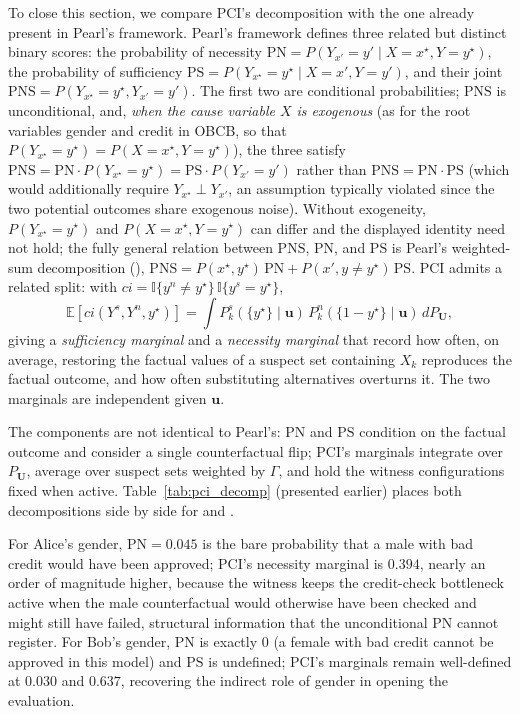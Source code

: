 To close this section, we compare PCI's decomposition with the one already
present in Pearl's framework. Pearl's framework defines three related but distinct
binary scores: the probability of necessity
$\mathrm{PN} = P(Y_{x'} = y' \mid X = x^\star, Y = y^\star)$, the probability of sufficiency
$\mathrm{PS} = P(Y_{x^\star} = y^\star \mid X = x', Y = y')$, and their joint
$\mathrm{PNS} = P(Y_{x^\star} = y^\star, Y_{x'} = y')$. The first two are conditional
probabilities; $\mathrm{PNS}$ is unconditional, and, \emph{when the cause variable
$X$ is exogenous} (as for the root variables gender and credit in OBCB, so that
$P(Y_{x^\star}=y^\star)=P(X=x^\star,Y=y^\star)$), the three satisfy
$\mathrm{PNS} = \mathrm{PN}\cdot P(Y_{x^\star}=y^\star) = \mathrm{PS}\cdot P(Y_{x'}=y')$ rather
than $\mathrm{PNS} = \mathrm{PN}\cdot\mathrm{PS}$ (which would additionally require
$Y_{x^\star}\perp Y_{x'}$, an assumption typically violated since the two potential
outcomes share exogenous noise). Without exogeneity, $P(Y_{x^\star}=y^\star)$ and
$P(X=x^\star,Y=y^\star)$ can differ and the displayed identity need not hold; the fully
general relation between $\mathrm{PNS}$, $\mathrm{PN}$, and $\mathrm{PS}$ is Pearl's
weighted-sum decomposition (\citealp[Lemma 9.2.6]{causalityPearl}),
$\mathrm{PNS} = P(x^\star,y^\star)\,\mathrm{PN} + P(x',y\neq y^\star)\,\mathrm{PS}$.
PCI admits a related split: with
$ci = \mathbb{I}\{y^n \neq y^\star\}\,\mathbb{I}\{y^s = y^\star\}$,
\[
\mathbb{E}[ci(Y^s, Y^n, y^\star)]
= \int P^s_k(\{y^\star\}\mid\mathbf{u})\,P^n_k(\{1{-}y^\star\}\mid\mathbf{u})\,dP_{\mathbf{U}},
\]
giving a \emph{sufficiency marginal} and a \emph{necessity marginal} that record how
often, on average, restoring the factual values of a suspect set containing $X_k$
reproduces the factual outcome, and how often substituting alternatives overturns it.
The two marginals are independent given $\mathbf{u}$.

The components are not identical to Pearl's: $\mathrm{PN}$ and $\mathrm{PS}$ condition
on the factual outcome and consider a single counterfactual flip; PCI's marginals
integrate over $P_{\mathbf{U}}$, average over suspect sets weighted by $\Gamma$, and
hold the witness configurations fixed when active. Table~\ref{tab:pci_decomp} (presented
earlier) places both decompositions side by side for  and
.


For Alice's gender, $\mathrm{PN} = 0.045$ is the bare probability that a male with bad
credit would have been approved; PCI's necessity marginal is $0.394$, nearly an order of
magnitude higher, because the  witness keeps the
credit-check bottleneck active when the male counterfactual would otherwise have been
checked and might still have failed, structural information that the unconditional
$\mathrm{PN}$ cannot register. For Bob's gender, $\mathrm{PN}$ is exactly $0$ (a female
with bad credit cannot be approved in this model) and $\mathrm{PS}$ is undefined; PCI's
marginals remain well-defined at $0.030$ and $0.637$, recovering the indirect role of
gender in opening the evaluation.

